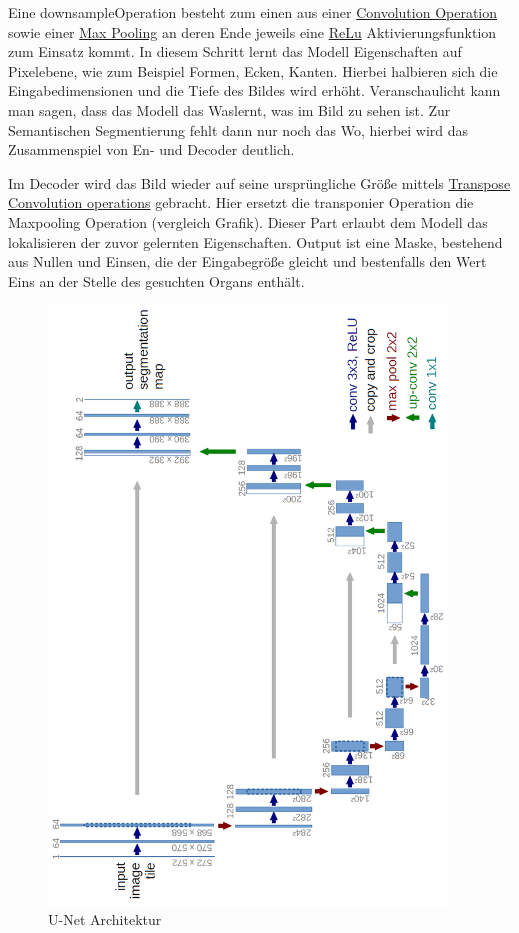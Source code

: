 Eine \glqq downsample\grqq  Operation besteht zum einen aus einer
\glqq \href{https://en.wikipedia.org/wiki/Convolution}{Convolution Operation}\grqq
sowie einer
\glqq \href{https://computersciencewiki.org/index.php/Max-pooling_/_Pooling}{Max Pooling}\grqq
an deren Ende jeweils eine
 \glqq \href{https://deepai.org/machine-learning-glossary-and-terms/relu}{ReLu}\grqq
 Aktivierungsfunktion zum Einsatz kommt. In diesem Schritt lernt das Modell Eigenschaften auf Pixelebene, wie zum Beispiel Formen, Ecken, Kanten. Hierbei halbieren sich die Eingabedimensionen und die Tiefe des Bildes wird erhöht. Veranschaulicht kann man sagen, dass das Modell das \glqq Was\grqq lernt, was im Bild zu sehen ist. \citep{Con97} Zur Semantischen Segmentierung fehlt dann nur noch das  \glqq Wo\grqq, hierbei wird das Zusammenspiel von En- und Decoder deutlich.

Im Decoder wird das Bild wieder auf seine ursprüngliche Größe mittels 
\glqq \href{https://en.wikipedia.org/wiki/Deconvolution}{Transpose Convolution operations}\grqq  
gebracht. Hier ersetzt die transponier Operation die Maxpooling Operation (vergleich Grafik). Dieser Part erlaubt dem Modell das lokalisieren der zuvor gelernten Eigenschaften. Output ist eine Maske, bestehend aus Nullen und Einsen, die der Eingabegröße gleicht und bestenfalls den Wert Eins an der Stelle des gesuchten Organs enthält.

\begin{figure}[htb]
	\begin{center}
		\includegraphics[width=300pt, angle=270]{bilder/u-net-architecture}
		\caption{U-Net Architektur}\label{Fig:unet-diagram}
	\end{center}
\end{figure}

